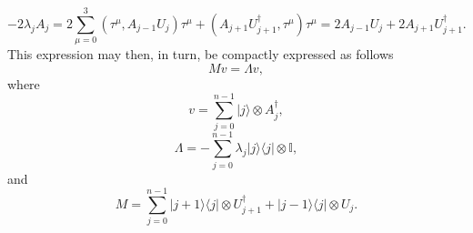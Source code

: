 \documentclass[12pt]{amsart}
\theoremstyle{definition}
\theoremstyle{remark}
\numberwithin{equation}{section}
\begin{document}
\begin{equation}
	-2\lambda_j A_j = 2\sum_{\mu = 0}^3 (\tau^{\mu}, A_{j-1}U_j)\tau^\mu + (A_{j+1}U_{j+1}^\dag, \tau^\mu ) \tau^\mu =2 A_{j-1}U_j+ 2A_{j+1}U_{j+1}^\dag.
\end{equation}
This expression may then, in turn, be compactly expressed as follows
\begin{equation}
	Mv = \Lambda v,
\end{equation}
where
\begin{equation}
	v = \sum_{j=0}^{n-1} |j\rangle \otimes A_j^\dag,
\end{equation}
\begin{equation}
	\Lambda = -\sum_{j=0}^{n-1}  \lambda_j|j\rangle\langle j|\otimes\mathbb{I},
\end{equation}
and
\begin{equation}
	M = \sum_{j=0}^{n-1} |j+1\rangle\langle j| \otimes U_{j+1}^\dag + |j-1\rangle\langle j|\otimes U_{j}.
\end{equation}
\end{document}
